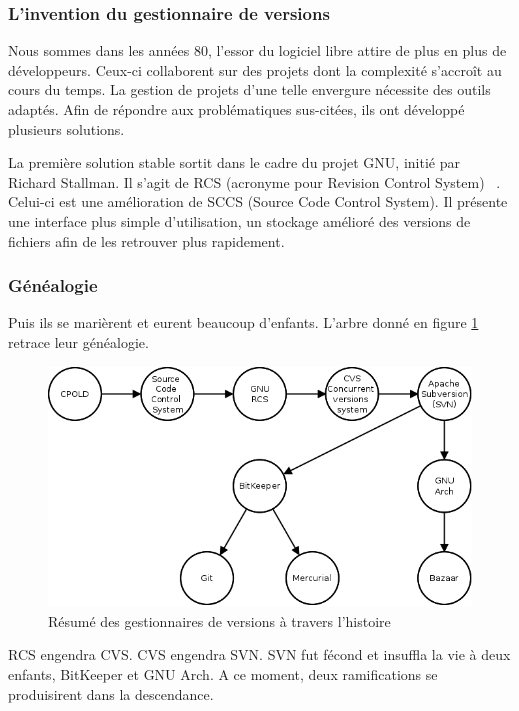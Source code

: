 \subsubsection{L'invention du gestionnaire de versions}

Nous sommes dans les années 80, l'essor du logiciel libre attire de plus en plus de développeurs. 
Ceux-ci collaborent sur des projets dont la complexité s'accroît au cours du temps. 
La gestion de projets d'une telle envergure nécessite des outils adaptés. 
Afin de répondre aux problématiques sus-citées, ils ont développé plusieurs solutions. 

La première solution stable sortit dans le cadre du projet GNU, initié par Richard Stallman. Il s'agit de RCS (acronyme pour Revision Control System) ~\cite{GNUWebSite}. 
Celui-ci est une amélioration de SCCS (Source Code Control System). Il présente une interface plus simple d'utilisation, un stockage amélioré des versions de fichiers afin de les retrouver plus rapidement. 

\subsubsection{Généalogie}

Puis ils se marièrent et eurent beaucoup d'enfants. L'arbre donné en figure \ref{fig:chronologie} retrace leur généalogie. 


\begin{figure}[h!]
  \centerline{
  \includegraphics[width=14cm]{images/chronologie.png}}
  \caption{Résumé des gestionnaires de versions à travers l'histoire}
  \label{fig:chronologie}
\end{figure}

RCS engendra CVS. CVS engendra SVN. SVN fut fécond et insuffla la vie à deux enfants, BitKeeper et GNU Arch. 
A ce moment, deux ramifications se produisirent dans la descendance. 

